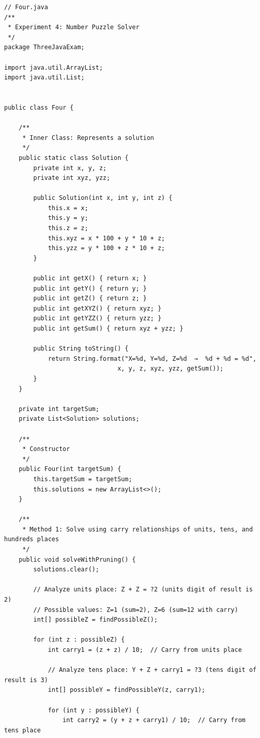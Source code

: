 \documentclass[12pt,a4paper]{article}
\begin{document}
\begin{lstlisting}
// Four.java
/**
 * Experiment 4: Number Puzzle Solver
 */
package ThreeJavaExam;

import java.util.ArrayList;
import java.util.List;


public class Four {
    
    /**
     * Inner Class: Represents a solution
     */
    public static class Solution {
        private int x, y, z;
        private int xyz, yzz;
        
        public Solution(int x, int y, int z) {
            this.x = x;
            this.y = y;
            this.z = z;
            this.xyz = x * 100 + y * 10 + z;
            this.yzz = y * 100 + z * 10 + z;
        }
        
        public int getX() { return x; }
        public int getY() { return y; }
        public int getZ() { return z; }
        public int getXYZ() { return xyz; }
        public int getYZZ() { return yzz; }
        public int getSum() { return xyz + yzz; }

        public String toString() {
            return String.format("X=%d, Y=%d, Z=%d  →  %d + %d = %d", 
                               x, y, z, xyz, yzz, getSum());
        }
    }
    
    private int targetSum;
    private List<Solution> solutions;
    
    /**
     * Constructor
     */
    public Four(int targetSum) {
        this.targetSum = targetSum;
        this.solutions = new ArrayList<>();
    }
    
    /**
     * Method 1: Solve using carry relationships of units, tens, and hundreds places
     */
    public void solveWithPruning() {
        solutions.clear();
        
        // Analyze units place: Z + Z = ?2 (units digit of result is 2)
        // Possible values: Z=1 (sum=2), Z=6 (sum=12 with carry)
        int[] possibleZ = findPossibleZ();
        
        for (int z : possibleZ) {
            int carry1 = (z + z) / 10;  // Carry from units place
            
            // Analyze tens place: Y + Z + carry1 = ?3 (tens digit of result is 3)
            int[] possibleY = findPossibleY(z, carry1);
            
            for (int y : possibleY) {
                int carry2 = (y + z + carry1) / 10;  // Carry from tens place
                

\end{lstlisting}
\end{document}
